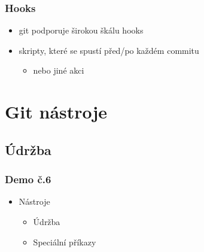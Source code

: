 \documentclass[pdftex]{beamer}
\begin{document}
\begin{frame}
	\frametitle{Hooks}
	\begin{itemize}
		\item git podporuje širokou škálu hooks
		\item skripty, které se spustí před/po každém commitu
		\begin{itemize} \item nebo jiné akci \end{itemize}
	\end{itemize}
\end{frame}

\section{Git nástroje}

\subsection{Údržba}

\begin{frame}
	\frametitle{Demo č.6}
	\begin{itemize}
		\item{Nástroje}
		\begin{itemize}
			\item{Údržba}
			\item{Speciální příkazy}
		\end{itemize}
	\end{itemize}
\end{frame}

\end{document}
